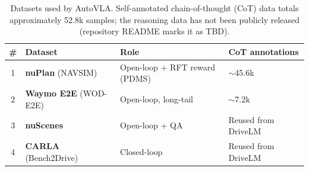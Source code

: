 \documentclass[11pt]{article}
\begin{document}
\begin{table}[t]
\centering
\addtocounter{table}{1}
\begin{tabular}{clll}
\toprule
\# & Dataset & Role & CoT annotations \\
\midrule
1 & \textbf{nuPlan} (NAVSIM)     & Open-loop + RFT reward (PDMS) & $\sim$45.6k \\
2 & \textbf{Waymo E2E} (WOD-E2E) & Open-loop, long-tail          & $\sim$7.2k \\
3 & \textbf{nuScenes}            & Open-loop + QA                & Reused from DriveLM \\
4 & \textbf{CARLA} (Bench2Drive) & Closed-loop                   & Reused from DriveLM \\
\bottomrule
\end{tabular}
\caption{Datasets used by AutoVLA. Self-annotated chain-of-thought (CoT) data
totals approximately 52.8k samples; the reasoning data has not been publicly
released (repository README marks it as TBD).}
\label{tab:autovla_datasets}
\end{table}
\end{document}
